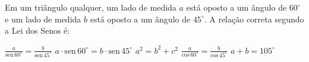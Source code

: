 Em um triângulo qualquer, um lado de medida $a$ está oposto a um ângulo de $60^\circ$ e um lado de medida $b$ está oposto a um ângulo de $45^\circ$. A relação correta segundo a Lei dos Senos é:

\parbox{\linewidth}{

$\frac{a}{\text{sen}\,60^\circ} = \frac{b}{\text{sen}\,45^\circ}$
$a \cdot \text{sen}\,60^\circ = b \cdot \text{sen}\,45^\circ$
$a^2 = b^2 + c^2$
$\frac{a}{\text{cos}\,60^\circ} = \frac{b}{\text{cos}\,45^\circ}$
$a+b = 105^\circ$

}



